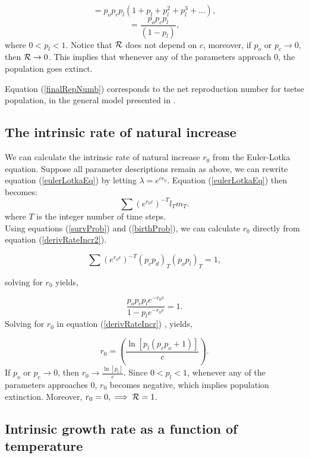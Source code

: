 \documentclass[12pt,a4paper]{article}
\begin{document}
$$=p_op_cp_l (1 + p_l + p_l^2 + p_l^3 + ...),$$
\begin{equation}
\label{finalRepNumb} 
=\frac{p_op_cp_l}{(1-p_l)},
\end{equation}
where $0 < p_l < 1$. Notice that ${\cal R}$ does not depend on $c$, moreover, if $p_o$ or $p_c \rightarrow{0}$, then ${\cal R} \rightarrow{0}$. This implies that whenever any of the parameters approach $0$, the population goes extinct.

Equation  (\ref{finalRepNumb}) corresponds to the net reproduction number for tsetse population, in the general model presented in \cite{Are2019a}.

\subsection*{The intrinsic rate of natural increase}
We can calculate the intrinsic rate of natural increase $r_0$ from the  Euler-Lotka equation.  Suppose all parameter descriptions remain as above, we can rewrite equation (\ref{eulerLotkaEq}) by letting $\lambda= e^{cr_0}$. Equation (\ref{eulerLotkaEq}) then becomes:
\begin{equation}
\label{derivRateIncr2} 
\sum (e^{r_0c})^{-T}l_{T}m_{T}.
\end{equation}
where $ T $ is the integer number of time steps. \\

Using equations  (\ref{survProb}) and  (\ref{birthProb}), we can calculate $r_0$ directly from equation (\ref{derivRateIncr2}).


$$\sum (e^{r_0c})^{-T}(p_cp_d)_{T}(p_op_l)_{T} =1,$$

solving for $r_0$ yields, 

\begin{equation}
\label{derivRateIncr} 
\frac{p_op_cp_le^{-r_0c}}{1-p_le^{-r_0c}} =1.
\end{equation}
Solving for $r_0$ in equation (\ref{derivRateIncr}) , yields, 

\begin{equation}
\label{finalRateIncrs} 
r_0 = (\frac{\ln[p_l(p_cp_o+1)]}{c}).
\end{equation}
If  $p_o$ or $p_c \rightarrow{0}$, then  $r_0 \rightarrow{\frac{\ln[p_l]}{c}}$. Since $0 < p_l < 1$, whenever any of the parameters approaches $0$, $r_0$ becomes negative, which implies  population extinction. Moreover, $r_0 = 0, \implies {\cal R} = 1$.  


\subsection*{Intrinsic growth rate as a function of temperature}
\end{document}
